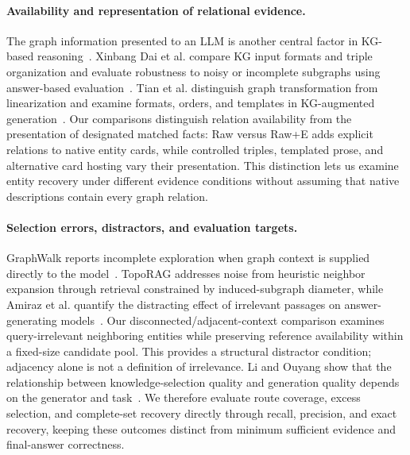 \paragraph{Availability and representation of relational evidence.}
The graph information presented to an LLM is another central factor in KG-based reasoning~\cite{dai2024kgunderstanding,tian2025alignment}. Xinbang Dai et al. compare KG input formats and triple organization and evaluate robustness to noisy or incomplete subgraphs using answer-based evaluation~\cite{dai2024kgunderstanding}. Tian et al. distinguish graph transformation from linearization and examine formats, orders, and templates in KG-augmented generation~\cite{tian2025alignment}. Our comparisons distinguish relation availability from the presentation of designated matched facts: Raw versus Raw+E adds explicit relations to native entity cards, while controlled triples, templated prose, and alternative card hosting vary their presentation. This distinction lets us examine entity recovery under different evidence conditions without assuming that native descriptions contain every graph relation.

\paragraph{Selection errors, distractors, and evaluation targets.}
GraphWalk reports incomplete exploration when graph context is supplied directly to the model~\cite{ghandi2026graphwalk}. TopoRAG addresses noise from heuristic neighbor expansion through retrieval constrained by induced-subgraph diameter, while Amiraz et al. quantify the distracting effect of irrelevant passages on answer-generating models~\cite{wu2026toporag,amiraz2025distracting}. Our disconnected/adjacent-context comparison examines query-irrelevant neighboring entities while preserving reference availability within a fixed-size candidate pool. This provides a structural distractor condition; adjacency alone is not a definition of irrelevance. Li and Ouyang show that the relationship between knowledge-selection quality and generation quality depends on the generator and task~\cite{li2025selection}. We therefore evaluate route coverage, excess selection, and complete-set recovery directly through recall, precision, and exact recovery, keeping these outcomes distinct from minimum sufficient evidence and final-answer correctness.

